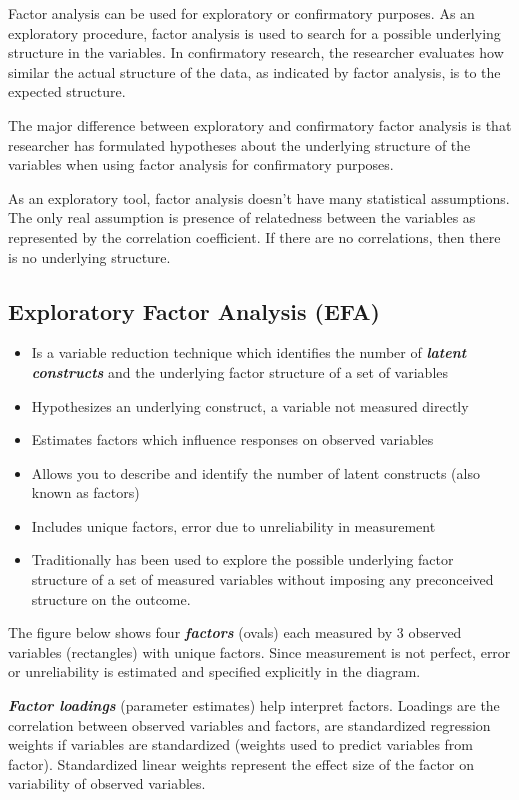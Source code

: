 \documentclass[a4paper,12pt]{article}
\begin{document}
Factor analysis can be used for exploratory or confirmatory purposes.
As an exploratory procedure, factor analysis is used to search for a
possible underlying structure in the variables. In confirmatory research,
the researcher evaluates how similar the actual structure of the data, as
indicated by factor analysis, is to the expected structure.

The major difference between exploratory and confirmatory factor
analysis is that researcher has formulated hypotheses about the
underlying structure of the variables when using factor analysis for
confirmatory purposes.

As an exploratory tool, factor analysis doesn't have many statistical
assumptions. The only real assumption is presence of relatedness
between the variables as represented by the correlation coefficient. If
there are no correlations, then there is no underlying structure.

\subsection{Exploratory Factor Analysis (EFA)}
\begin{itemize}
\item Is a variable reduction technique which identifies the number of \textbf{\emph{latent constructs}} and the underlying factor
structure of a set of variables
\item Hypothesizes an underlying construct, a variable not measured directly
\item Estimates factors which influence responses on observed variables
\item Allows you to describe and identify the number of latent constructs (also known as factors)
\item Includes unique factors, error due to unreliability in measurement
\item Traditionally has been used to explore the possible underlying factor structure of a set of measured variables without imposing any preconceived structure on the outcome.
\end{itemize}

The figure below shows four \textbf{\emph{factors}} (ovals) each measured by 3 observed variables (rectangles) with unique factors. Since measurement is not perfect, error or unreliability is estimated and specified explicitly in the diagram.

\textbf{\emph{Factor loadings}} (parameter estimates) help interpret factors. Loadings are the correlation between observed variables and factors, are standardized regression weights if variables are standardized (weights used to predict variables from factor). Standardized linear weights represent the effect size of the factor
on variability of observed variables.
\end{document}

